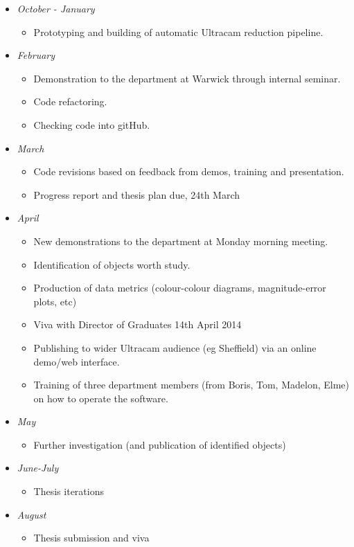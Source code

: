 \documentclass[a4paper,10pt]{article}
\begin{document}
\begin{itemize}
	\item \emph{October - January}
	\begin{itemize} 
		\item Prototyping and building of automatic Ultracam reduction pipeline.
	\end{itemize}
	\item \emph{February}
	\begin{itemize} 
		\item Demonstration to the department at Warwick through internal seminar.
		\item Code refactoring.
		\item Checking code into gitHub.
	\end{itemize}
	\item \emph{March}
	\begin{itemize} 
	      \item Code revisions based on feedback from demos, training and presentation.
	      \item Progress report and thesis plan due, 24th March
	\end{itemize}
	\item \emph{April}
	\begin{itemize} 
	      \item New demonstrations to the department at Monday morning meeting.
	      \item Identification of objects worth study.
	      \item Production of data metrics (colour-colour diagrams, magnitude-error plots, etc)
	      \item Viva with Director of Graduates 14th April 2014
	      \item Publishing to wider Ultracam audience (eg Sheffield) via an online demo/web interface.
	      \item Training of three department members (from Boris, Tom, Madelon, Elme) on how to operate the software.
	\end{itemize}
	\item \emph{May}
	\begin{itemize} 
	      \item Further investigation (and publication of identified objects)
	\end{itemize}
	\item \emph{June-July}
	\begin{itemize} 
	      \item Thesis iterations
	\end{itemize}
	\item \emph{August}
	\begin{itemize} 
	      \item Thesis submission and viva
	\end{itemize}
 \end{itemize}
\end{document}
